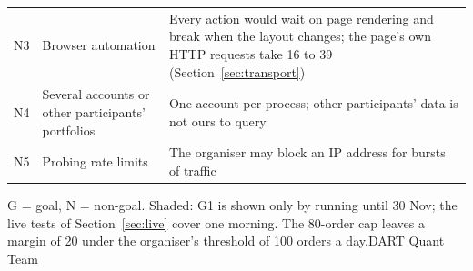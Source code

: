 {{\begin{tabularx}{\linewidth}{>{\RaggedRight\arraybackslash}p{7mm} >{\RaggedRight\arraybackslash}p{70mm} >{\RaggedRight\arraybackslash}X}
N3 & Browser automation & Every action would wait on page rendering and break when the layout changes; the page's own HTTP requests take 16 to 39\ms{} (Section~\ref{sec:transport})\\\rowsep
N4 & Several accounts or other participants' portfolios & One account per process; other participants' data is not ours to query\\\rowsep
N5 & Probing rate limits & The organiser may block an IP address for bursts of traffic\\
\end{tabularx}}}{G = goal, N = non-goal. Shaded: G1 is shown only by running until 30 Nov; the live tests of Section~\ref{sec:live} cover one morning. The 80-order cap leaves a margin of 20 under the organiser's threshold of 100 orders a day.}{DART Quant Team}
